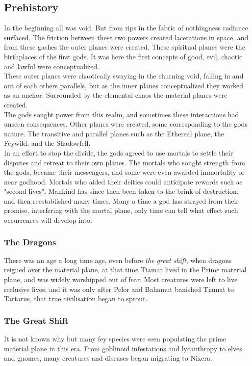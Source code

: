 \documentclass[a4paper]{article}
\begin{document}
\subsection{Prehistory}
In the beginning all was void. But from rips in the fabric of nothingness radiance surfaced. The friction between these two powers created lacerations in space, and from these gashes the outer planes were created. These spiritual planes were the birthplaces of the first gods. It was here the first concepts of good, evil, chaotic and lawful were conceptualized.\\
These outer planes were chaotically swaying in the churning void, falling in and out of each others parallels, but as the inner planes conceptualized they worked as an anchor. Surrounded by the elemental chaos the material planes were created.\\
The gods sought power from this realm, and sometimes these interactions had unseen consequences. Other planes were created, some corresponding to the gods nature. The transitive and parallel planes such as the Ethereal plane, the Feywild, and the Shadowfell.\\
In an effort to stop the divide, the gods agreed to use mortals to settle their disputes and retreat to their own planes. The mortals who sought strength from the gods, became their messengers, and some were even awarded immortality or near godhood. Mortals who aided their deities could anticipate rewards such as "second lives". Mankind has since then been taken to the brink of destruction, and then reestablished many times. Many a time a god has strayed from their promise, interfering with the mortal plane, only time can tell what effect such occurrences will develop into.


\subsubsection{The Dragons}
There was an age a long time age, even before \textit{the great shift}, when dragons reigned over the material plane, at that time Tiamat lived in the Prime material plane, and was widely worshipped out of fear. Most creatures were left to live reclusive lives, and it was only after Pelor and Bahamut banished Tiamat to Tartarus, that true civilisation began to sprout.

\subsubsection{The Great Shift}
It is not known why but many fey species were seen populating the prime material plane in this era. From goblinoid infestations and lycanthropy to elves and gnomes, many creatures and diseases began migrating to Nixera. 
\end{document}
